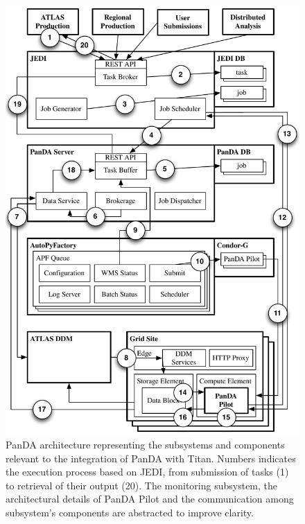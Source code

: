 \begin{figure}
  \begin{center}
    \includegraphics[width=\columnwidth]{figures/panda_architecture.pdf}
  \end{center}
\caption{PanDA architecture representing the subsystems and components relevant
to the integration of PanDA with Titan. Numbers indicates the execution process
based on JEDI, from submission of tasks (1) to retrieval of their output (20).
The monitoring subsystem, the architectural details of PanDA Pilot and the
communication among subsystem's components are abstracted to improve clarity.
}
\label{fig:architecture}
\end{figure}

